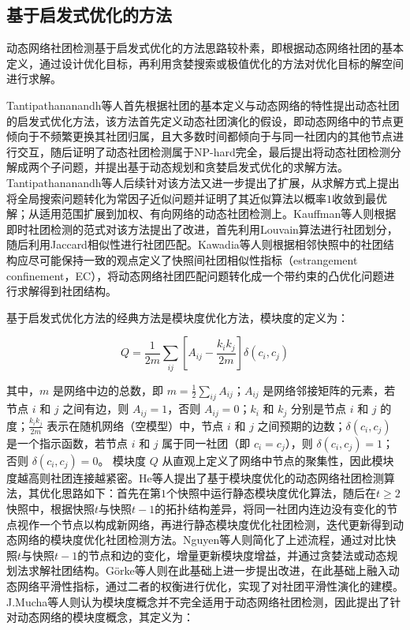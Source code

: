 \subsection{基于启发式优化的方法}
动态网络社团检测基于启发式优化的方法思路较朴素，即根据动态网络社团的基本定义，通过设计优化目标，再利用贪婪搜索或极值优化的方法对优化目标的解空间进行求解。

Tantipathananandh等人\cite{tantipathananandh2007framework}首先根据社团的基本定义与动态网络的特性提出动态社团的启发式优化方法，该方法首先定义动态社团演化的假设，即动态网络中的节点更倾向于不频繁更换其社团归属，且大多数时间都倾向于与同一社团内的其他节点进行交互，随后证明了动态社团检测属于NP-hard完全，最后提出将动态社团检测分解成两个子问题，并提出基于动态规划和贪婪启发式优化的求解方法。Tantipathananandh等人后续针对该方法又进一步提出了扩展，从求解方式上提出将全局搜索问题转化为常因子近似问题并证明了其近似算法以概率$1$收敛到最优解\cite{tantipathananandh2009constant}；从适用范围扩展到加权、有向网络的动态社团检测上\cite{tantipathananandh2011finding}。Kauffman等人\cite{kauffman2014dyconet}则根据即时社团检测的范式对该方法提出了改进，首先利用Louvain算法进行社团划分，随后利用Jaccard相似性进行社团匹配。Kawadia等人\cite{kawadia2012sequential}则根据相邻快照中的社团结构应尽可能保持一致的观点定义了快照间社团相似性指标（estrangement confinement，EC），将动态网络社团匹配问题转化成一个带约束的凸优化问题进行求解得到社团结构。

基于启发式优化方法的经典方法是模块度优化方法，模块度\cite{newman2004finding}的定义为：


\begin{equation}
	Q = \frac{1}{2m} \sum_{ij} \left[ A_{ij} - \frac{k_i k_j}{2m} \right] \delta(c_i, c_j)
\end{equation}

其中，\( m \) 是网络中边的总数，即 \( m = \frac{1}{2} \sum_{ij} A_{ij} \)；\( A_{ij} \) 是网络邻接矩阵的元素，若节点 \( i \) 和 \( j \) 之间有边，则 \( A_{ij} = 1 \)，否则 \( A_{ij} = 0 \)；\( k_i \) 和 \( k_j \) 分别是节点 \( i \) 和 \( j \) 的度；\( \frac{k_i k_j}{2m} \) 表示在随机网络（空模型）中，节点 \( i \) 和 \( j \) 之间预期的边数；\( \delta(c_i, c_j) \) 是一个指示函数，若节点 \( i \) 和 \( j \) 属于同一社团（即 \( c_i = c_j \)），则 \( \delta(c_i, c_j) = 1 \)；否则 \( \delta(c_i, c_j) = 0 \)。
模块度 \( Q \) 从直观上定义了网络中节点的聚集性，因此模块度越高则社团连接越紧密。He等人\cite{he2015fast}提出了基于模块度优化的动态网络社团检测算法，其优化思路如下：首先在第\(1\)个快照中运行静态模块度优化算法，随后在$t \ge 2$快照中，根据快照$t$与快照$t-1$的拓扑结构差异，将同一社团内连边没有变化的节点视作一个节点以构成新网络，再进行静态模块度优化社团检测，迭代更新得到动态网络的模块度优化社团检测方法。Nguyen等人\cite{nguyen2011adaptive}则简化了上述流程，通过对比快照$t$与快照$t-1$的节点和边的变化，增量更新模块度增益，并通过贪婪法或动态规划法求解社团结构。G{\"o}rke等人\cite{gorke2013dynamic}则在此基础上进一步提出改进，在此基础上融入动态网络平滑性指标，通过二者的权衡进行优化，实现了对社团平滑性演化的建模。J.Mucha等人\cite{mucha2010community}则认为模块度概念并不完全适用于动态网络社团检测，因此提出了针对动态网络的模块度概念，其定义为：

